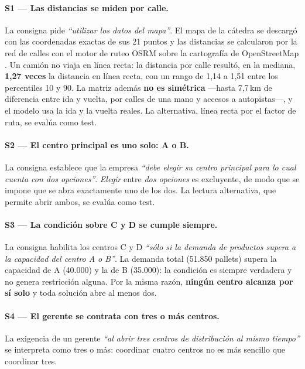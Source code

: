 \documentclass[10pt,a4paper]{article}
\newcommand{\cita}[1]{\emph{``#1''}}
\begin{document}
\paragraph{S1 — Las distancias se miden por calle.} La consigna pide
\cita{utilizar los datos del mapa}. El mapa de la cátedra se descargó con las
coordenadas exactas de sus 21 puntos y las distancias se calcularon por la red
de calles con el motor de ruteo OSRM \cite{osrm} sobre la cartografía de
OpenStreetMap \cite{osm}. Un camión no viaja en línea recta: la distancia por
calle resultó, en la mediana, \textbf{1,27 veces} la distancia en línea recta,
con un rango de 1,14 a 1,51 entre los percentiles 10 y 90. La matriz además
\textbf{no es simétrica} —hasta 7,7\,km de diferencia entre ida y vuelta, por
calles de una mano y accesos a autopistas—, y el modelo usa la ida y la vuelta
reales. La alternativa, línea recta por el factor de ruta, se evalúa como
test.

\paragraph{S2 — El centro principal es uno solo: A o B.} La consigna establece
que la empresa \cita{debe elegir su centro principal para lo cual cuenta con
dos opciones}. \emph{Elegir} entre \emph{dos opciones} es excluyente, de modo
que se impone que se abra exactamente uno de los dos. La lectura alternativa,
que permite abrir ambos, se evalúa como test.

\paragraph{S3 — La condición sobre C y D se cumple siempre.} La consigna
habilita los centros C y D \cita{sólo si la demanda de productos supera a la
capacidad del centro A o B}. La demanda total (51.850 pallets) supera la
capacidad de A (40.000) y la de B (35.000): la condición es siempre verdadera
y no genera restricción alguna. Por la misma razón, \textbf{ningún centro
alcanza por sí solo} y toda solución abre al menos dos.

\paragraph{S4 — El gerente se contrata con tres o más centros.} La exigencia
de un gerente \cita{al abrir tres centros de distribución al mismo tiempo} se
interpreta como tres o más: coordinar cuatro centros no es más sencillo que
coordinar tres.
\end{document}
